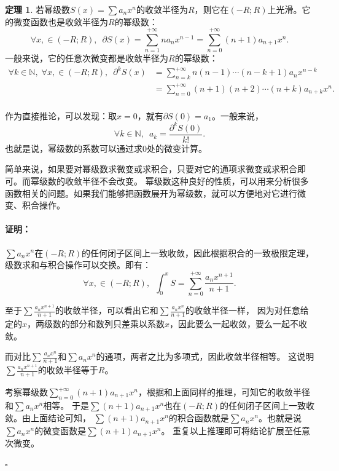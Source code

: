\documentclass[12pt,UTF8]{ctexbook}
\theoremstyle{definition}
\newtheorem{tm}{定理}[section]
\theoremstyle{plain}
\renewenvironment{proof}{\paragraph{\textbf{证明：}}}{\hfill$\square$}
\begin{document}
\begin{appendix}
\begin{tm}
    若幂级数$S(x) = \sum a_n x^n$的收敛半径为$R$，则它在$(-R;R)$上光滑。它的微变函数也是收敛半径为$R$的幂级数：
    $$ \forall x, \in (-R;R),\,\,\, \partial S(x) =  \sum_{n=1}^{+\infty} na_n x^{n-1} = \sum_{n=0}^{+\infty} (n + 1)a_{n+1} x^{n}. $$
    一般来说，它的任意次微变都是收敛半径为$R$的幂级数：
    \begin{align*}
        \forall k \in \mathbb{N},\;\forall x, \in (-R;R),\,\,\, \partial^k S(x) &= \sum_{n=k}^{+\infty} n(n-1)\cdots(n - k + 1)a_n x^{n-k} \\
        &= \sum_{n=0}^{+\infty} (n + 1)(n + 2)\cdots(n + k)a_{n+k} x^{n}. \\
    \end{align*}
\end{tm}

作为直接推论，可以发现：取$x=0$，就有$\partial S(0) = a_1$。一般来说，
$$\forall k\in \mathbb{N}, \,\,\, a_k = \frac{\partial^k S(0)}{k!}.$$
也就是说，幂级数的系数可以通过求$0$处的微变计算。

简单来说，如果要对幂级数求微变或求积合，只要对它的通项求微变或求积合即可。而幂级数的收敛半径不会改变。
幂级数这种良好的性质，可以用来分析很多函数相关的问题。如果我们能够把函数展开为幂级数，就可以方便地对它进行微变、积合操作。

\begin{proof}
    $\sum a_n x^n$在$(-R;R)$的任何闭子区间上一致收敛，因此根据积合的一致极限定理，级数求和与积合操作可以交换。即有：
    $$ \forall x, \in (-R;R),\,\,\, \int_0^x S = \sum_{n=0}^{+\infty} \frac{a_n x^{n+1}}{n + 1}. $$
    
    至于$\sum \frac{a_n x^{n+1}}{n + 1}$的收敛半径，可以看出它和$\sum \frac{a_n x^{n}}{n + 1}$的收敛半径一样，
    因为对任意给定的$x$，两级数的部分和数列只差乘以系数$x$，因此要么一起收敛，要么一起不收敛。
    
    而对比$\sum \frac{a_n x^{n}}{n + 1}$和$\sum a_n x^n$的通项，两者之比为多项式，因此收敛半径相等。
    这说明$\sum \frac{a_n x^{n+1}}{n + 1}$的收敛半径等于$R$。

    考察幂级数$\sum_{n=0}^{+\infty} (n + 1)a_{n+1} x^{n}$，根据和上面同样的推理，可知它的收敛半径和$\sum a_n x^n$相等。
    于是$\sum (n + 1)a_{n+1} x^{n}$也在$(-R;R)$的任何闭子区间上一致收敛。由上面结论可知，
    $\sum (n + 1)a_{n+1} x^{n}$的积合函数就是$\sum a_n x^n$。也就是说$\sum a_n x^n$的微变函数是$\sum (n + 1)a_{n+1} x^{n}$。
    重复以上推理即可将结论扩展至任意次微变。

\end{proof}


\end{appendix}
\end{document}
